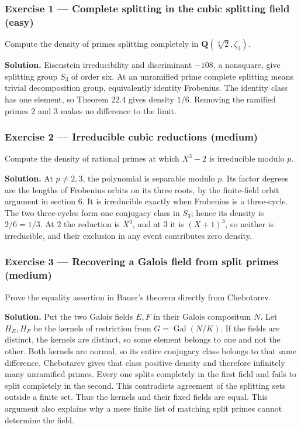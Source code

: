 \documentclass[11pt,a4paper]{article}
\begin{document}
\subsubsection{Exercise 1 --- Complete splitting in the cubic splitting
field
(easy)}\label{exercise-1-complete-splitting-in-the-cubic-splitting-field-easy}

Compute the density of primes splitting completely in
\(\mathbf Q(\sqrt[3]2,\zeta_3)\).

\textbf{Solution.} Eisenstein irreducibility and discriminant \(-108\),
a nonsquare, give splitting group \(S_3\) of order six. At an unramified
prime complete splitting means trivial decomposition group, equivalently
identity Frobenius. The identity class has one element, so Theorem 22.4
gives density \(1/6\). Removing the ramified primes 2 and 3 makes no
difference to the limit.

\subsubsection{Exercise 2 --- Irreducible cubic reductions
(medium)}\label{exercise-2-irreducible-cubic-reductions-medium}

Compute the density of rational primes at which \(X^3-2\) is irreducible
modulo \(p\).

\textbf{Solution.} At \(p\ne2,3\), the polynomial is separable modulo
\(p\). Its factor degrees are the lengths of Frobenius orbits on its
three roots, by the finite-field orbit argument in section 6. It is
irreducible exactly when Frobenius is a three-cycle. The two
three-cycles form one conjugacy class in \(S_3\); hence its density is
\(2/6=1/3\). At 2 the reduction is \(X^3\), and at 3 it is \((X+1)^3\),
so neither is irreducible, and their exclusion in any event contributes
zero density.

\subsubsection{Exercise 3 --- Recovering a Galois field from split
primes
(medium)}\label{exercise-3-recovering-a-galois-field-from-split-primes-medium}

Prove the equality assertion in Bauer's theorem directly from
Chebotarev.

\textbf{Solution.} Put the two Galois fields \(E,F\) in their Galois
compositum \(N\). Let \(H_E,H_F\) be the kernels of restriction from
\(G=\operatorname{Gal}(N/K)\). If the fields are distinct, the kernels
are distinct, so some element belongs to one and not the other. Both
kernels are normal, so its entire conjugacy class belongs to that same
difference. Chebotarev gives that class positive density and therefore
infinitely many unramified primes. Every one splits completely in the
first field and fails to split completely in the second. This
contradicts agreement of the splitting sets outside a finite set. Thus
the kernels and their fixed fields are equal. This argument also
explains why a mere finite list of matching split primes cannot
determine the field.
\end{document}
